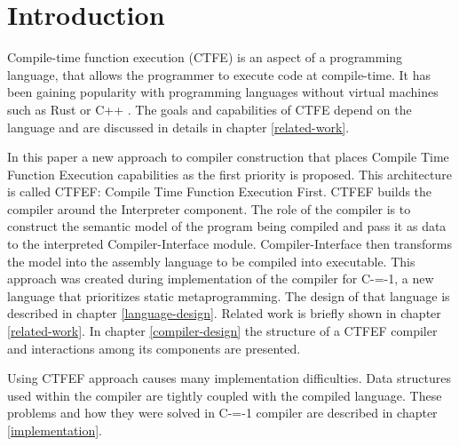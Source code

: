 \section{Introduction}


Compile-time function execution (CTFE) is an aspect of a programming language, that allows the programmer to execute code at compile-time.
It has been gaining popularity with programming languages without virtual machines such as Rust \cite{rust} or C++ \cite{ISO:cpp98}.
The goals and capabilities of CTFE depend on the language and are discussed in details in chapter \ref{related-work}.

In this paper a new approach to compiler construction that places Compile Time Function Execution capabilities as the first priority is proposed.
This architecture is called CTFEF: Compile Time Function Execution First. CTFEF builds the compiler around the Interpreter component.
The role of the compiler is to construct the semantic model of the program being compiled and pass it as data to the interpreted Compiler-Interface module.
Compiler-Interface then transforms the model into the assembly language to be compiled into executable.
This approach was created during implementation of the compiler for C-=-1, a new language that prioritizes static metaprogramming.
The design of that language is described in chapter \ref{language-design}.
Related work is briefly shown in chapter \ref{related-work}.
In chapter \ref{compiler-design} the structure of a CTFEF compiler and interactions among its components are presented.


Using CTFEF approach causes many implementation difficulties. Data structures used within the compiler are tightly coupled with the compiled language.
These problems and how they were solved in C-=-1 compiler are described in chapter \ref{implementation}.